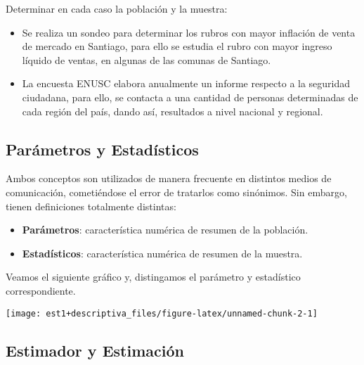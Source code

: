 \documentclass[
]{book}
\providecommand{\tightlist}{%
  \setlength{\itemsep}{0pt}\setlength{\parskip}{0pt}}
\theoremstyle{definition}
\theoremstyle{definition}
\theoremstyle{definition}
\theoremstyle{definition}
\theoremstyle{remark}
\begin{document}
Determinar en cada caso la población y la muestra:

\begin{itemize}
\tightlist
\item
  Se realiza un sondeo para determinar los rubros con mayor inflación de venta de mercado en Santiago, para ello se estudia el rubro con mayor ingreso líquido de ventas, en algunas de las comunas de Santiago.
\item
  La encuesta ENUSC elabora anualmente un informe respecto a la seguridad ciudadana, para ello, se contacta a una cantidad de personas determinadas de cada región del país, dando así, resultados a nivel nacional y regional.
\end{itemize}

\hypertarget{paruxe1metros-y-estaduxedsticos}{%
\subsection*{Parámetros y Estadísticos}\label{paruxe1metros-y-estaduxedsticos}}

Ambos conceptos son utilizados de manera frecuente en distintos medios de comunicación, cometiéndose el error de tratarlos como sinónimos. Sin embargo, tienen definiciones totalmente distintas:

\begin{itemize}
\tightlist
\item
  \textbf{Parámetros}: característica numérica de resumen de la población.
\item
  \textbf{Estadísticos}: característica numérica de resumen de la muestra.
\end{itemize}

Veamos el siguiente gráfico y, distingamos el parámetro y estadístico correspondiente.

\begin{center}\texttt{[image: est1+descriptiva\_files/figure-latex/unnamed-chunk-2-1]} \end{center}

\hypertarget{estimador-y-estimaciuxf3n}{%
\subsection*{Estimador y Estimación}\label{estimador-y-estimaciuxf3n}}
\end{document}
